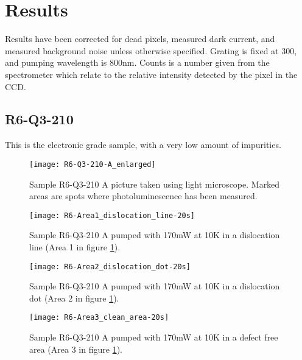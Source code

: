 \section{Results}

Results have been corrected for dead pixels, measured dark current, and measured background noise unless otherwise specified. Grating is fixed at 300, and pumping wavelength is 800nm. Counts is a number given from the spectrometer which relate to the relative intensity detected by the pixel in the CCD.

\subsection{R6-Q3-210}

This is the electronic grade sample, with a very low amount of impurities.

\begin{figure}[H]
\centering
\texttt{[image: R6-Q3-210-A\_enlarged]}
\caption[R6-Q3-210 A from light microscope]{Sample R6-Q3-210 A picture taken using light microscope. Marked areas are spots where photoluminescence has been measured.}
\label{fig:R6-Q3-210-A_enlarged}%
\end{figure}


\begin{figure}[H]
\centering
\texttt{[image: R6-Area1\_dislocation\_line-20s]}
\caption[R6-Q3-210 at a dislocation line]{Sample R6-Q3-210 A pumped with 170mW at 10K in a dislocation line (Area 1 in figure \ref{fig:R6-Q3-210-A_enlarged}).}
\label{fig:R6-Area1_dislocation_line-20s}%
\end{figure}


\begin{figure}[H]
\centering
\texttt{[image: R6-Area2\_dislocation\_dot-20s]}
\caption[R6-Q3-210 at a dislocation dot]{Sample R6-Q3-210 A pumped with 170mW at 10K in a dislocation dot (Area 2 in figure \ref{fig:R6-Q3-210-A_enlarged}).}
\label{fig:R6-Area2_dislocation_dot-20s}%
\end{figure}


\begin{figure}[H]
\centering
\texttt{[image: R6-Area3\_clean\_area-20s]}
\caption[R6-Q3-210 at a defect free area]{Sample R6-Q3-210 A pumped with 170mW at 10K in a defect free area (Area 3 in figure \ref{fig:R6-Q3-210-A_enlarged}).}
\label{fig:R6-Area3_clean_area-20s}%
\end{figure}


